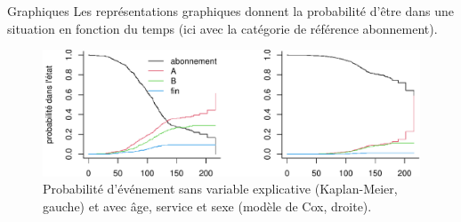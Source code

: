 \documentclass[
  ignorenonframetext,
]{beamer}
\begin{document}
\begin{frame}{Graphiques}
\protect\hypertarget{graphiques}{}
Les représentations graphiques donnent la probabilité d'être dans une
situation en fonction du temps (ici avec la catégorie de référence
abonnement).

\footnotesize

\begin{figure}

{\centering \includegraphics[width=1\textwidth,height=\textheight]{MATH60602-diapos10_files/figure-beamer/fig-competitif-1.pdf}

}

\caption{\label{fig-competitif}Probabilité d'événement sans variable
explicative (Kaplan-Meier, gauche) et avec âge, service et sexe (modèle
de Cox, droite).}

\end{figure}
\end{frame}
\end{document}
